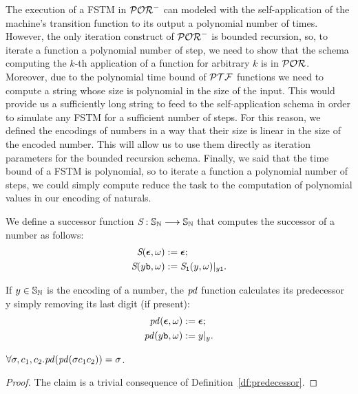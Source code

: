 The execution of a FSTM in $\mathcal{POR}^-$ can modeled with the
self-application of the machine's transition function to its output
a polynomial number of times. However, the only iteration construct of $\mathcal{POR}^-$
is bounded recursion, so, to iterate a function a polynomial number of step,
we need to show that the schema computing the $k$-th application of a function
for arbitrary $k$ is in $\mathcal{POR}$. Moreover, due to the polynomial time bound of
$\mathcal{PTF}$ functions we need to compute a string whose size is polynomial in the size of the
input. This would provide us a sufficiently long string to
feed to the self-application schema in order to simulate any FSTM for a
sufficient number of steps.
%
For this reason, we defined the encodings of numbers in a way that
their size is linear in the size of the encoded number. This will allow us to use
them directly as iteration parameters for the bounded recursion schema.
%
Finally, we said that the time bound of a FSTM is polynomial, so to iterate
a function a polynomial number of steps, we could simply compute reduce the task
to the computation of polynomial values in our encoding of naturals.

\begin{defn}[Successor]
We define a successor function
$\emph{S} : \mathbb{S}_{\mathbb{N}} \longrightarrow \mathbb{S}_{\mathbb{N}}$
that computes the successor of a number as follows:
\begin{align*}
\emph{S}(\bm{\epsilon}, \omega) &:= \bm{\epsilon}; \\
\emph{S}(y\mathtt{b}, \omega) &:= \emph{S}_{\mathtt{1}}(y,\omega)|_{y\mathtt{1}}.
\end{align*}
\end{defn}
\noindent


\begin{defn}[Predecessor]\label{df:predecessor}
If $y\in \mathbb{S}_{\mathbb{N}}$ is the encoding
of a number,
the $\mathit{pd}$ function calculates
its predecessor y simply removing its
last digit (if present):
\begin{align*}
\mathit{pd}(\bm{\epsilon},\omega) &:= \bm{\epsilon}; \\
\mathit{pd}(y\mathtt{b},\omega) &:= y|_y.
\end{align*}
\end{defn}

\begin{remark}
$\forall \sigma,c_1,c_2.\mathit{pd}(\mathit{pd}(\sigma c_1c_2))=\sigma$.
\end{remark}
\begin{proof}
The claim is a trivial consequence of Definition~\ref{df:predecessor}.
\end{proof}


